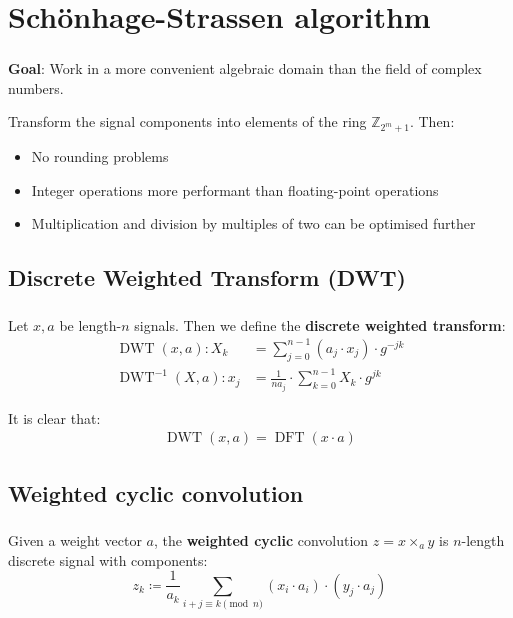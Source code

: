 \documentclass{beamer}
\DeclareMathOperator{\DFT}{DFT}
\DeclareMathOperator{\DWT}{DWT}
\begin{document}
\section{Schönhage-Strassen algorithm}

\begin{frame}
		\frametitle{\secname}

		\textbf{Goal}: Work in a more convenient algebraic domain than the
		field of complex numbers.

		Transform the signal components into elements of the ring
		$\mathbb{Z}_{2^m + 1}$. Then:

		\begin{itemize}
				\item No rounding problems
				\item Integer operations more performant than floating-point
						operations
				\item Multiplication and division by multiples of two can be
						optimised further
		\end{itemize}

\end{frame}

\subsection{Discrete Weighted Transform (DWT)}

\begin{frame}
		\frametitle{\secname}
		\framesubtitle{\subsecname}

		Let $x, a$ be length-$n$ signals. Then we define the \textbf{discrete weighted transform}:
		\begin{align*}
				\DWT(x, a) : X_k & = \sum_{j=0}^{n-1} (a_j \cdot x_j) \cdot g^{-jk} \\
				\DWT^{-1}(X, a) : x_j & = \frac{1}{n a_j} \cdot \sum_{k = 0}^{n - 1} X_k \cdot g^{jk}
		\end{align*}

		It is clear that:
		\begin{align*}
				\DWT(x, a) = \DFT(x \cdot a)
		\end{align*}
\end{frame}

\subsection{Weighted cyclic convolution}

\begin{frame}
		\frametitle{\secname}
		\framesubtitle{\subsecname}

		Given a weight vector $a$, the \textbf{weighted cyclic} convolution $z
		= x \times_a y$ is $n$-length discrete signal with components:
		\[
				z_k \coloneqq \frac{1}{a_k} \sum_{i + j \equiv k \pmod{n}} (x_i \cdot a_i) \cdot (y_j \cdot a_j)
		\]
\end{frame}
\end{document}
